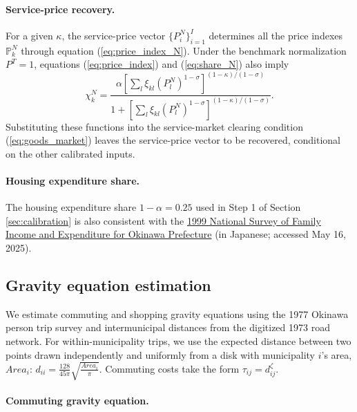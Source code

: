 \documentclass[12pt, unicode, a4paper]{article}
\newcommand{\1}{\mbox{1}\hspace{-0.25em}\mbox{l}} %
\begin{document}
\paragraph{Service-price recovery.}
For a given $\kappa$, the service-price vector $\{P_i^N\}_{i=1}^I$ determines all the price indexes $\mathbb{P}_k^N$ through equation (\ref{eq:price_index_N}).
Under the benchmark normalization $P^T=1$, equations (\ref{eq:price_index}) and (\ref{eq:share_N}) also imply
\begin{equation*}
    \chi_k^N=
    \frac{\alpha\left[\sum_l\xi_{kl}(P_l^N)^{1-\sigma}\right]^{(1-\kappa)/(1-\sigma)}}
    {1+\left[\sum_l\xi_{kl}(P_l^N)^{1-\sigma}\right]^{(1-\kappa)/(1-\sigma)}}.
\end{equation*}
Substituting these functions into the service-market clearing condition (\ref{eq:goods_market}) leaves the service-price vector to be recovered, conditional on the other calibrated inputs.

\paragraph{Housing expenditure share.}
The housing expenditure share $1-\alpha=0.25$ used in Step 1 of Section \ref{sec:calibration} is also consistent with the \href{https://www.e-stat.go.jp/stat-search/files?page=1&layout=datalist&toukei=00200564&tstat=000000640001&cycle=0&tclass1=000000640041&tclass2=000000640134&tclass3=000000640135&iroha=9&tclass4val=0}{1999 National Survey of Family Income and Expenditure for Okinawa Prefecture} (in Japanese; accessed May 16, 2025).

\clearpage

\subsection{Gravity equation estimation}\label{appsec:gravity}

We estimate commuting and shopping gravity equations using the 1977 Okinawa person trip survey and intermunicipal distances from the digitized 1973 road network. For within-municipality trips, we use the expected distance between two points drawn independently and uniformly from a disk with municipality $i$'s area, $Area_i$: $d_{ii}=\frac{128}{45\pi}\sqrt{\frac{Area_i}{\pi}}$. Commuting costs take the form $\tau_{ij}=d_{ij}^{\zeta}$.

\paragraph{Commuting gravity equation.}
\end{document}
